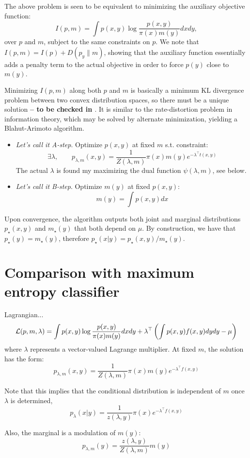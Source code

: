 \documentclass[english]{scrartcl}
\begin{document}
The above problem is seen to be equivalent to minimizing the auxiliary
objective function:
$$
I(p,m) 
= \int p(x,y) \log \frac{p(x,y)}{\pi(x)m(y)} dxdy,
$$ over $p$ and $m$, subject to the same constraints on $p$. We note
that $I(p,m)=I(p)+D(p_y\|m)$, showing that the auxiliary function
essentially adds a penalty term to the actual objective in order to
force $p(y)$ close to $m(y)$.

Minimizing $I(p,m)$ along both $p$ and $m$ is basically a minimum KL
divergence problem between two convex distribution spaces, so there
must be a unique solution {\bf -- to be checked in
  \cite{Cover-91}}. It is similar to the rate-distortion problem in
information theory, which may be solved by alternate minimization,
yielding a Blahut-Arimoto algorithm.
\begin{itemize}
\item {\em Let's call it A-step}. Optimize $p(x,y)$ at fixed $m$
  s.t. constraint:
$$
\exists \lambda, \qquad
p_{\lambda,m}(x,y) = \frac{1}{Z(\lambda, m)} \pi(x) m(y) e^{-\lambda^\top t(x,y)}
$$
The actual $\lambda$ is found my maximizing the dual function
$\psi(\lambda,m)$, see below.
\item {\em Let's call it B-step}. Optimize $m(y)$ at fixed $p(x,y)$:
$$
m(y) = \int p(x,y) dx
$$
\end{itemize}

Upon convergence, the algorithm outputs both joint and marginal
distributions $p_{\star}(x,y)$ and $m_{\star}(y)$ that both depend on
$\mu$. By construction, we have that $p_{\star}(y) = m_{\star}(y)$,
therefore $p_\star(x|y)=p_{\star}(x,y)/m_{\star}(y)$.


\section{Comparison with maximum entropy classifier}

Lagrangian...
$$
{\cal L}(p,m,\lambda)
= 
\int p(x,y) \log \frac{p(x,y)}{\pi(x)m(y)} dxdy
+
\lambda^\top \left( 
\int p(x,y) f(x,y) dydy - \mu 
\right)
$$ where $\lambda$ represents a vector-valued Lagrange multiplier. At
fixed $m$, the solution has the form:
$$
p_{\lambda,m}(x,y) = \frac{1}{Z(\lambda,m)}
\pi(x) m(y) e^{-\lambda^\top f(x,y)} 
$$

Note that this implies that the conditional distribution is
independent of $m$ once $\lambda$ is determined,
$$
p_\lambda(x|y) = \frac{1}{z(\lambda,y)} \pi(x) e^{-\lambda^\top f(x,y)} 
$$

Also, the marginal is a modulation of $m(y)$:
$$
p_{\lambda,m}(y) = \frac{z(\lambda,y)}{Z(\lambda,m)} m(y)
$$
\end{document}
